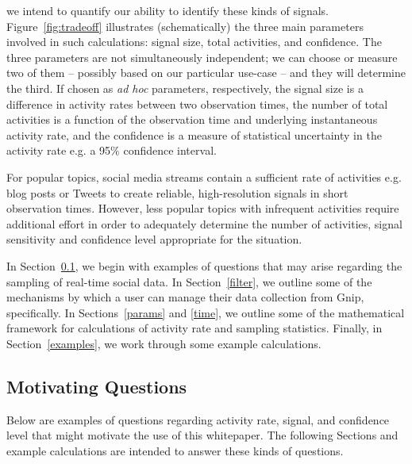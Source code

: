 \documentclass{article}
\begin{document}
we intend to quantify our ability to identify these kinds of signals. Figure~\ref{fig:tradeoff} 
illustrates (schematically) the three main parameters involved in such calculations: signal size, total 
activities, and confidence. The three parameters are not simultaneously independent; we can 
choose or measure two of them -- possibly based on our particular use-case -- and they will 
determine the third. If chosen as \emph{ad hoc} parameters, respectively, the signal 
size is a difference in activity rates between two observation times, the number of total 
activities is a function of the observation time and underlying instantaneous activity rate, and the 
confidence is a measure of statistical uncertainty in the activity rate e.g. a 95$\%$ 
confidence interval.

For popular topics, social media streams contain a sufficient rate of activities e.g. blog posts or 
Tweets to create reliable, high-resolution signals in short observation times.  
However, less popular topics with infrequent activities require additional effort in order to adequately 
determine the number of activities, signal sensitivity and confidence level appropriate for the 
situation.

In Section~\ref{Qs}, we begin with examples of questions that may arise regarding 
the sampling of real-time social data. In Section~\ref{filter}, we outline some of the mechanisms 
by which a user can manage their data collection from Gnip, specifically. In Sections~\ref{params} and 
\ref{time}, we outline some of the mathematical framework for calculations 
of activity rate and sampling statistics. Finally, in Section~\ref{examples}, we work 
through some example calculations.



\subsection{Motivating Questions} 
\label{Qs}

Below are examples of questions regarding activity rate, signal, and confidence level that might 
motivate the use of this whitepaper. The following Sections and example calculations are intended 
to answer these kinds of questions.
\end{document}
